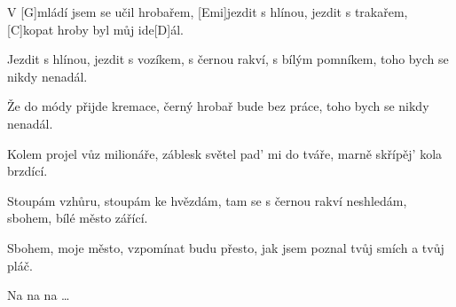 
\sloka
V [G]mládí jsem se učil hrobařem, 
[Emi]jezdit s hlínou, jezdit s trakařem, 
[C]kopat hroby byl můj ide[D]ál. 

\sloka
Jezdit s hlínou, jezdit s vozíkem, 
s černou rakví, s bílým pomníkem, 
toho bych se nikdy nenadál. 

\sloka
Že do módy přijde kremace, 
černý hrobař bude bez práce, 
toho bych se nikdy nenadál. 

\sloka
Kolem projel vůz milionáře, 
záblesk světel pad’ mi do tváře, 
marně skřípěj’ kola brzdící. 

\sloka
Stoupám vzhůru, stoupám ke hvězdám, 
tam se s černou rakví neshledám, 
sbohem, bílé město zářící. 

\sloka
Sbohem, moje město, 
vzpomínat budu přesto, 
jak jsem poznal tvůj smích a tvůj pláč. 

\napis{}
Na na na …
